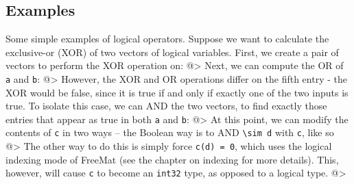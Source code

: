 \subsection{Examples}

Some simple examples of logical operators.  Suppose we want to calculate the exclusive-or (XOR) of two vectors of logical variables.  First, we create a pair of vectors to perform the XOR operation on:
@>
Next, we can compute the OR of \verb|a| and \verb|b|:
@>
However, the XOR and OR operations differ on the fifth entry - the XOR would be false, since it is true if and only if exactly one of the two inputs is true.  To isolate this case, we can AND the two vectors, to find exactly those entries that appear as true in both \verb|a| and \verb|b|:
@>
At this point, we can modify the contents of \verb|c| in two ways -- the Boolean way is to AND \verb|\sim d| with \verb|c|, like so
@>
The other way to do this is simply force \verb|c(d) = 0|, which uses the logical indexing mode of FreeMat (see the chapter on indexing for more details).  This, however, will cause \verb|c| to become an \verb|int32| type, as opposed to a logical type.
@>
